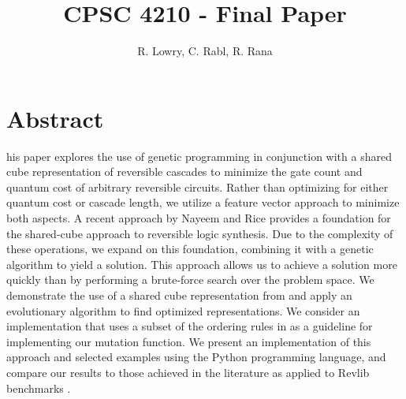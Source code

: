 \documentclass[12pt]{article}
\title{CPSC 4210 - Final Paper}
\author{R. Lowry, C. Rabl, R. Rana}
\date{}
\begin{document}
\maketitle

\section*{Abstract}

his paper explores the use of genetic programming in conjunction with a shared cube representation of reversible cascades to minimize the gate count and quantum cost of arbitrary reversible circuits. Rather than optimizing for either quantum cost or cascade length, we utilize a feature vector approach to minimize both aspects. A recent approach by Nayeem and Rice provides a foundation for the shared-cube approach to reversible logic synthesis. Due to the complexity of these operations, we expand on this foundation, combining it with a genetic algorithm to yield a solution. This approach allows us to achieve a solution more quickly than by performing a brute-force search over the problem space.
We demonstrate the use of a shared cube representation from \cite{Nayeem2011} and apply an evolutionary algorithm to find optimized representations. We consider an implementation that uses a subset of the ordering rules in \cite{Rice2011} as a guideline for implementing our mutation function. We present an implementation of this approach and selected examples using the Python programming language, and compare our results to those achieved in the literature as applied to Revlib benchmarks \cite{RevLib}.

\begingroup
\let\clearpage\relax













\endgroup

\pagebreak


\end{document}
